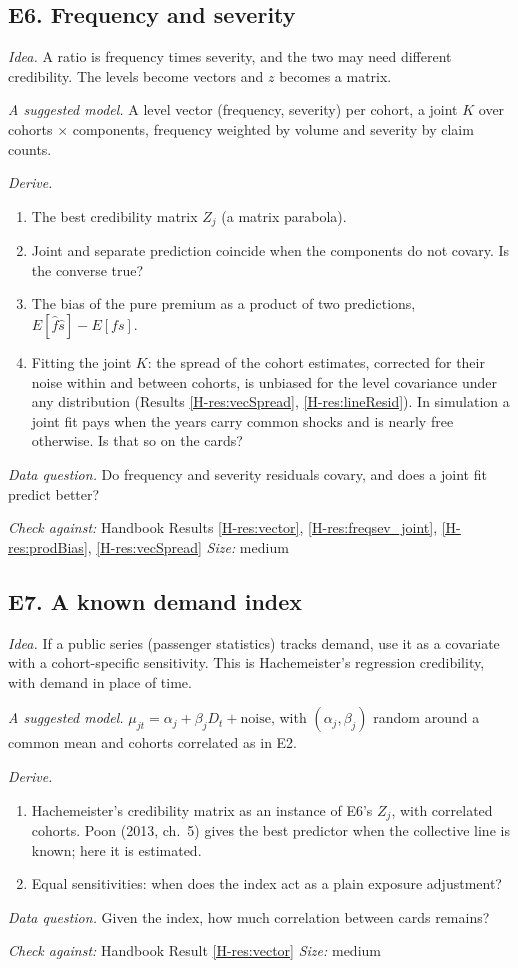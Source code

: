 \documentclass[10pt]{article}
\newcommand{\hb}[1]{\ref*{H-#1}}
\newcommand{\ext}[7]{%
  \subsection*{#1}
  \textit{Idea.} #2\par\smallskip
  \textit{A suggested model.} #3\par\smallskip
  \textit{Derive.}
  \begin{enumerate}\setlength{\itemsep}{1pt}\setlength{\parskip}{0pt}#4\end{enumerate}
  \textit{Data question.} #5\par\smallskip
  {\small\textit{Check against:} Handbook #6 \quad\textperiodcentered\quad \textit{Size:} #7}\par}
\begin{document}
\ext{E6. Frequency and severity}
{A ratio is frequency times severity, and the two may need different credibility. The levels become
vectors and $z$ becomes a matrix.}
{A level vector (frequency, severity) per cohort, a joint $K$ over cohorts $\times$ components,
frequency weighted by volume and severity by claim counts.}
{\item The best credibility matrix $Z_j$ (a matrix parabola).
 \item Joint and separate prediction coincide when the components do not covary. Is the converse
   true?
 \item The bias of the pure premium as a product of two predictions,
   $E[\hat f\hat s] - E[fs]$.
 \item Fitting the joint $K$: the spread of the cohort estimates, corrected for their noise within
   and between cohorts, is unbiased for the level covariance under any distribution (Results
   \hb{res:vecSpread}, \hb{res:lineResid}). In simulation a joint fit pays when the years carry
   common shocks and is nearly free otherwise. Is that so on the cards?}
{Do frequency and severity residuals covary, and does a joint fit predict better?}
{Results \hb{res:vector}, \hb{res:freqsev_joint}, \hb{res:prodBias}, \hb{res:vecSpread}}{medium}

\ext{E7. A known demand index}
{If a public series (passenger statistics) tracks demand, use it as a covariate with a
cohort-specific sensitivity. This is Hachemeister's regression credibility, with demand in place of
time.}
{$\mu_{jt} = \alpha_j + \beta_j D_t + \text{noise}$, with $(\alpha_j, \beta_j)$ random around a
common mean and cohorts correlated as in E2.}
{\item Hachemeister's credibility matrix as an instance of E6's $Z_j$, with correlated cohorts.
   Poon (2013, ch.~5) gives the best predictor when the collective line is known; here it is
   estimated.
 \item Equal sensitivities: when does the index act as a plain exposure adjustment?}
{Given the index, how much correlation between cards remains?}
{Result \hb{res:vector}}{medium}
\end{document}
